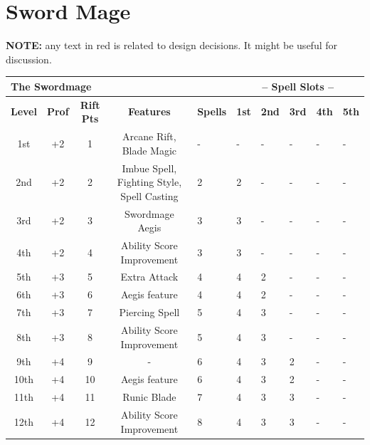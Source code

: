 \chapter{Sword Mage}

{\color{red}  \textbf{NOTE:} any text in red is related to design decisions. It might be useful for discussion.}    

\begin{table}[ht!]
\begin{small}
\begin{center}
\begin{tabular}{ccccllllll}
\multicolumn{5}{l}{\parbox[l][0.6cm][c]{8cm}{\textbf{The Swordmage}}} & 
\multicolumn{5}{c}{\textbf{-- Spell Slots --}}
\\
\hline 
\textbf{Level} & \textbf{Prof} & \textbf{Rift Pts} & \parbox[l][0.6cm][c]{8cm}{\textbf{Features}} & \textbf{Spells} & \textbf{1st} & \textbf{2nd} & \textbf{3rd} & \textbf{4th} & \textbf{5th}
\\ 
1st & +2 &  1   & \parbox[l][0.6cm][c]{8cm}{Arcane Rift, Blade Magic} & - & - & - & - & - & -\\
2nd & +2 &  2   & \parbox[l][0.6cm][c]{8cm}{Imbue Spell, Fighting Style, Spell Casting} & 2  & 2 & - & - & - & -\\
3rd & +2 &  3   & \parbox[l][0.6cm][c]{8cm}{Swordmage Aegis} & 3 & 3 & - & -& - & -\\
4th & +2 &  4   & \parbox[l][0.6cm][c]{8cm}{Ability Score Improvement} & 3  & 3 & - & - & - & -\\
5th & +3 &  5   & \parbox[l][0.6cm][c]{8cm}{Extra Attack} & 4 & 4 & 2 & - & - & -\\
6th & +3 &  6   & \parbox[l][0.6cm][c]{8cm}{Aegis feature} & 4 & 4 & 2 & - & - & -\\
7th & +3 &  7   & \parbox[l][0.6cm][c]{8cm}{Piercing Spell} & 5 & 4 & 3 & - & - & -\\
8th & +3 &  8   & \parbox[l][0.6cm][c]{8cm}{Ability Score Improvement} & 5 & 4 & 3 & - & - & -\\
9th & +4 &  9  & \parbox[l][0.6cm][c]{8cm}{-} & 6 & 4 & 3 & 2 & - & -\\
10th & +4 & 10  & \parbox[l][0.6cm][c]{8cm}{Aegis feature} & 6  & 4 & 3 & 2 & - & -\\
11th & +4 & 11 & \parbox[l][0.6cm][c]{8cm}{Runic Blade} & 7 & 4 & 3 & 3 & - & -\\
12th & +4 & 12  & \parbox[l][0.6cm][c]{8cm}{Ability Score Improvement} & 8 & 4 & 3 & 3 & - & -\\

\end{tabular}
\end{center}
\end{small}
\end{table}
